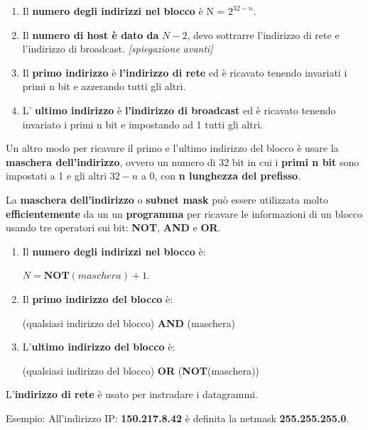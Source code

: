 \documentclass[11pt,a4paper,oneside]{book}
\theoremstyle{definition}
\begin{document}
\begin{enumerate}
	\item Il \textbf{numero degli indirizzi nel blocco} è N = $2^{32 - n}$.
	\item Il \textbf{numero di host è dato da } $N - 2$, devo sottrarre l'indirizzo di rete e l'indirizzo di broadcast. \textit{[spiegazione avanti]}
	\item Il \textbf{primo indirizzo} è \textbf{l'indirizzo di rete} ed è ricavato tenendo invariati i primi n bit e azzerando tutti gli altri.
	\item L' \textbf{ultimo indirizzo} è \textbf{l'indirizzo di broadcast} ed è ricavato tenendo invariato i primi n bit e impostando ad 1 tutti gli altri.
\end{enumerate}

Un altro modo per ricavare il primo e l'ultimo indirizzo del blocco è usare la \textbf{maschera dell'indirizzo}, ovvero un numero di 32 bit in cui i \textbf{primi n bit} sono impostati a 1 e gli altri $32 - n$ a 0, con \textbf{n lunghezza del prefisso}.

La \textbf{maschera dell'indirizzo} o \textbf{subnet mask} può essere utilizzata molto \textbf{efficientemente} da un un \textbf{programma} per ricavare le informazioni di un blocco usando tre operatori sui bit: \textbf{NOT}, \textbf{AND} e \textbf{OR}.

\begin{enumerate}
	\item Il \textbf{numero degli indirizzi nel blocco} è:
	      \begin{center}
		      $N = \textbf{NOT}(maschera) + 1$.
	      \end{center}
	\item Il \textbf{primo indirizzo del blocco} è:
	      \begin{center}
		      (qualsiasi indirizzo del blocco) \textbf{AND} (maschera)
	      \end{center}
	\item L'\textbf{ultimo indirizzo del blocco} è:
	      \begin{center}
		      (qualsiasi indirizzo del blocco) \textbf{OR} (\textbf{NOT}(maschera))
	      \end{center}
\end{enumerate}

L'\textbf{indirizzo di rete} è usato per instradare i datagrammi.

\pagebreak

Esempio:\newline
All'indirizzo IP: \textbf{150.217.8.42} è definita la netmask \textbf{255.255.255.0}.
\end{document}
